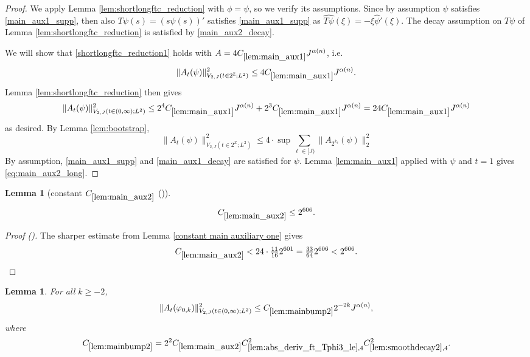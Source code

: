 \documentclass[12pt,reqno]{amsart}
\newcommand{\auto}{{({\tiny\faCar})}}
\theoremstyle{plain}
\newtheorem{lemma}[theorem]{Lemma}
\numberwithin{equation}{section}
\theoremstyle{remark}
\newcommand{\using}[1]{}
\newcommand{\Z}{{\mathbb Z}}
\begin{document}
\begin{proof}
We  apply Lemma \ref{lem:shortlongftc_reduction} with $\phi=\psi$, so we   verify its   assumptions. Since by assumption $\psi$ satisfies \eqref{main_aux1_supp}, then also $T\psi(s) = (s \psi(s))'$  satisfies \eqref{main_aux1_supp} as $\widehat{T\psi}(\xi) = -\xi\widehat{\psi}'(\xi)$. The decay assumption on $T\psi$ of Lemma \ref{lem:shortlongftc_reduction} is satisfied by \eqref{main_aux2_decay}.


We will show that \eqref{shortlongftc_reduction1} holds with $A=4C_{\ref{lem:main_aux1}}J^{\alpha(n)}$, i.e.
 \begin{equation}\label{eq:main_aux2_long}
\|A_t(\psi)\|^2_{V_{2,J}(t\in2^\Z;L^2)}
\le4C_{\ref{lem:main_aux1}}J^{\alpha(n)}.
\end{equation}
 Lemma \ref{lem:shortlongftc_reduction}   then  gives
\[\|A_t(\psi)\|_{V_{2,J}(t\in(0,\infty);L^2)}^2
\le2^4C_{\ref{lem:main_aux1}}J^{\alpha(n)}
+2^3C_{\ref{lem:main_aux1}}J^{\alpha(n)}
=24C_{\ref{lem:main_aux1}}J^{\alpha(n)} \]
 as desired.
By Lemma \ref{lem:bootstrap},
    \[\|A_{t}(\psi)\|^2_{V_{2,J}(t\in 2^{\Z}; L^2)} \le  4 \cdot \sup \sum_{\ell\in [J)} \|A_{2^{k_{\ell}}}(\psi)\|^2_2     \]
By assumption,   \eqref{main_aux1_supp} and \eqref{main_aux1_decay}  are satisfied for $\psi$.     Lemma \ref{lem:main_aux1} applied with $\psi$ and $t=1$  gives  \eqref{eq:main_aux2_long}.
\end{proof}

\begin{lemma}[constant $C_{\ref{lem:main_aux2}}$ \auto]\label{constant main auxiliary two}\using{constant main auxiliary one}\using{lem:main_aux2}
\begin{equation}\label{constant main auxiliary two bound}
C_{\ref{lem:main_aux2}}\le2^{606}.
\end{equation}
\end{lemma}
\begin{proof}[Proof \auto]
The sharper estimate from Lemma \ref{constant main auxiliary one} gives
\[
C_{\ref{lem:main_aux2}}
<24\cdot\tfrac{11}{16}2^{601}
=\tfrac{33}{64}2^{606}<2^{606}.
\]
\end{proof}


\begin{lemma}\label{lem:mainbump2}\using{lem:rescaling}\using{lem:main_aux2}\using{lem:abs_deriv_ft_Tphi3_le}\using{lem:smoothdecay2}\using{lem:ft_phi3_eq}\using{lem:abs_deriv_ft_phi3_le}\using{lem:ft_deriv_mul}
For all $k\ge-2$,
\begin{equation}\label{mainbump2}
\|A_t(\varphi_{0,k})\|_{V_{2,J}(t\in(0,\infty);L^2)}^2
\le C_{\ref{lem:mainbump2}}2^{-2k}J^{\alpha(n)},
\end{equation}
where
\begin{equation}\label{auto:main-bump-two-constant-definition}
C_{\ref{lem:mainbump2}}
=2^2C_{\ref{lem:main_aux2}}
C_{\ref{lem:abs_deriv_ft_Tphi3_le},4}^2
C_{\ref{lem:smoothdecay2},4}^2.
\end{equation}
\end{lemma}
\end{document}
